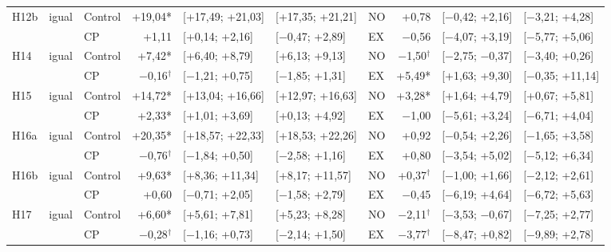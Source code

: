 \begin{table}[H]
{\begin{tabular}{@{}l l l r l l | l r l l@{}}
H12b & igual & Control & +19{,}04* & [+17{,}49; +21{,}03] & [+17{,}35; +21{,}21] & NO & +0{,}78 & [$-$0{,}42; +2{,}16] & [$-$3{,}21; +4{,}28] \\
 & & CP & +1{,}11 & [+0{,}14; +2{,}16] & [$-$0{,}47; +2{,}89] & EX & $-$0{,}56 & [$-$4{,}07; +3{,}19] & [$-$5{,}77; +5{,}06] \\
H14 & igual & Control & +7{,}42* & [+6{,}40; +8{,}79] & [+6{,}13; +9{,}13] & NO & $-$1{,}50$^\dagger$ & [$-$2{,}75; $-$0{,}37] & [$-$3{,}40; +0{,}26] \\
 & & CP & $-$0{,}16$^\dagger$ & [$-$1{,}21; +0{,}75] & [$-$1{,}85; +1{,}31] & EX & +5{,}49* & [+1{,}63; +9{,}30] & [$-$0{,}35; +11{,}14] \\
H15 & igual & Control & +14{,}72* & [+13{,}04; +16{,}66] & [+12{,}97; +16{,}63] & NO & +3{,}28* & [+1{,}64; +4{,}79] & [+0{,}67; +5{,}81] \\
 & & CP & +2{,}33* & [+1{,}01; +3{,}69] & [+0{,}13; +4{,}92] & EX & $-$1{,}00 & [$-$5{,}61; +3{,}24] & [$-$6{,}71; +4{,}04] \\
H16a & igual & Control & +20{,}35* & [+18{,}57; +22{,}33] & [+18{,}53; +22{,}26] & NO & +0{,}92 & [$-$0{,}54; +2{,}26] & [$-$1{,}65; +3{,}58] \\
 & & CP & $-$0{,}76$^\dagger$ & [$-$1{,}84; +0{,}50] & [$-$2{,}58; +1{,}16] & EX & +0{,}80 & [$-$3{,}54; +5{,}02] & [$-$5{,}12; +6{,}34] \\
H16b & igual & Control & +9{,}63* & [+8{,}36; +11{,}34] & [+8{,}17; +11{,}57] & NO & +0{,}37$^\dagger$ & [$-$1{,}00; +1{,}66] & [$-$2{,}12; +2{,}61] \\
 & & CP & +0{,}60 & [$-$0{,}71; +2{,}05] & [$-$1{,}58; +2{,}79] & EX & $-$0{,}45 & [$-$6{,}19; +4{,}64] & [$-$6{,}72; +5{,}63] \\
H17 & igual & Control & +6{,}60* & [+5{,}61; +7{,}81] & [+5{,}23; +8{,}28] & NO & $-$2{,}11$^\dagger$ & [$-$3{,}53; $-$0{,}67] & [$-$7{,}25; +2{,}77] \\
 & & CP & $-$0{,}28$^\dagger$ & [$-$1{,}16; +0{,}73] & [$-$2{,}14; +1{,}50] & EX & $-$3{,}77$^\dagger$ & [$-$8{,}47; +0{,}82] & [$-$9{,}89; +2{,}78] \\
\bottomrule\end{tabular}}\end{table}
